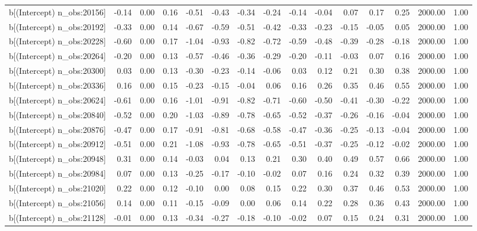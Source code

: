 \begin{table}[ht]
\begin{tabular}{rrrrrrrrrrrrrrr}
  b[(Intercept) n\_obs:20156] & -0.14 & 0.00 & 0.16 & -0.51 & -0.43 & -0.34 & -0.24 & -0.14 & -0.04 & 0.07 & 0.17 & 0.25 & 2000.00 & 1.00 \\ 
  b[(Intercept) n\_obs:20192] & -0.33 & 0.00 & 0.14 & -0.67 & -0.59 & -0.51 & -0.42 & -0.33 & -0.23 & -0.15 & -0.05 & 0.05 & 2000.00 & 1.00 \\ 
  b[(Intercept) n\_obs:20228] & -0.60 & 0.00 & 0.17 & -1.04 & -0.93 & -0.82 & -0.72 & -0.59 & -0.48 & -0.39 & -0.28 & -0.18 & 2000.00 & 1.00 \\ 
  b[(Intercept) n\_obs:20264] & -0.20 & 0.00 & 0.13 & -0.57 & -0.46 & -0.36 & -0.29 & -0.20 & -0.11 & -0.03 & 0.07 & 0.16 & 2000.00 & 1.00 \\ 
  b[(Intercept) n\_obs:20300] & 0.03 & 0.00 & 0.13 & -0.30 & -0.23 & -0.14 & -0.06 & 0.03 & 0.12 & 0.21 & 0.30 & 0.38 & 2000.00 & 1.00 \\ 
  b[(Intercept) n\_obs:20336] & 0.16 & 0.00 & 0.15 & -0.23 & -0.15 & -0.04 & 0.06 & 0.16 & 0.26 & 0.35 & 0.46 & 0.55 & 2000.00 & 1.00 \\ 
  b[(Intercept) n\_obs:20624] & -0.61 & 0.00 & 0.16 & -1.01 & -0.91 & -0.82 & -0.71 & -0.60 & -0.50 & -0.41 & -0.30 & -0.22 & 2000.00 & 1.00 \\ 
  b[(Intercept) n\_obs:20840] & -0.52 & 0.00 & 0.20 & -1.03 & -0.89 & -0.78 & -0.65 & -0.52 & -0.37 & -0.26 & -0.16 & -0.04 & 2000.00 & 1.00 \\ 
  b[(Intercept) n\_obs:20876] & -0.47 & 0.00 & 0.17 & -0.91 & -0.81 & -0.68 & -0.58 & -0.47 & -0.36 & -0.25 & -0.13 & -0.04 & 2000.00 & 1.00 \\ 
  b[(Intercept) n\_obs:20912] & -0.51 & 0.00 & 0.21 & -1.08 & -0.93 & -0.78 & -0.65 & -0.51 & -0.37 & -0.25 & -0.12 & -0.02 & 2000.00 & 1.00 \\ 
  b[(Intercept) n\_obs:20948] & 0.31 & 0.00 & 0.14 & -0.03 & 0.04 & 0.13 & 0.21 & 0.30 & 0.40 & 0.49 & 0.57 & 0.66 & 2000.00 & 1.00 \\ 
  b[(Intercept) n\_obs:20984] & 0.07 & 0.00 & 0.13 & -0.25 & -0.17 & -0.10 & -0.02 & 0.07 & 0.16 & 0.24 & 0.32 & 0.39 & 2000.00 & 1.00 \\ 
  b[(Intercept) n\_obs:21020] & 0.22 & 0.00 & 0.12 & -0.10 & 0.00 & 0.08 & 0.15 & 0.22 & 0.30 & 0.37 & 0.46 & 0.53 & 2000.00 & 1.00 \\ 
  b[(Intercept) n\_obs:21056] & 0.14 & 0.00 & 0.11 & -0.15 & -0.09 & 0.00 & 0.06 & 0.14 & 0.22 & 0.28 & 0.36 & 0.43 & 2000.00 & 1.00 \\ 
  b[(Intercept) n\_obs:21128] & -0.01 & 0.00 & 0.13 & -0.34 & -0.27 & -0.18 & -0.10 & -0.02 & 0.07 & 0.15 & 0.24 & 0.31 & 2000.00 & 1.00 \\ 

\end{tabular}
\end{table}
